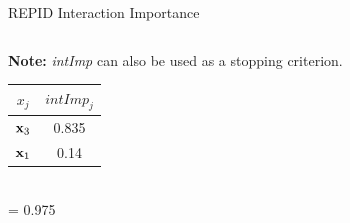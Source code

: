 \documentclass[10pt,compress,t,notes=noshow, xcolor=table]{beamer}
\begin{document}
\begin{frame}{REPID Interaction Importance}
\begin{columns}[T, totalwidth=\textwidth]
\begin{column}{0.54\textwidth}
    \textbf{Note:} \textit{intImp} can also be used as a stopping criterion.
    
 \vspace{-200px}
    \scriptsize
 \hspace{130px}
 \setlength{\tabcolsep}{1pt}
 \begin{tabular}{|c|c|}
    \hline
       $x_j$ & $intImp_j$  \\\hline
       \rowcolor{ForestGreen!70}
        $\mathbf{x}_3$     & 0.835 \\
        \rowcolor{YellowGreen!50}
        $\mathbf{x}_1$     &  0.14\\\hline
    \end{tabular}\\
 \hspace{138px}= 0.975

    \end{column}

\end{columns}

\end{frame}
\end{document}
